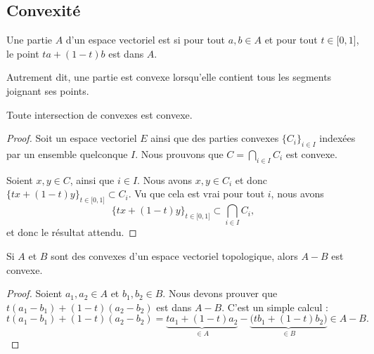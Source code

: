 \subsection{Convexité}

\begin{definition}        \label{DEFooQQEOooAFKbcQ}
	Une partie \( A\) d'un espace vectoriel est  si pour tout \( a,b\in A\) et pour tout \( t\in \mathopen[ 0 , 1 \mathclose]\), le point \( ta+(1-t)b\) est dans \( A\).

	Autrement dit, une partie est convexe lorsqu'elle contient tous les segments joignant ses points.
\end{definition}

\begin{proposition} \label{PROPooJOCEooUKhkqQ}
	Toute intersection de convexes est convexe.
\end{proposition}

\begin{proof}
	Soit un espace vectoriel \( E\) ainsi que des parties convexes \( \{  C_i \}_{i\in I}\) indexées par un ensemble quelconque \( I\). Nous prouvons que \( C= \bigcap_{i\in I}C_i\) est convexe.

	Soient \( x, y\in C\), ainsi que \( i\in I\). Nous avons \( x,y\in C_i\) et donc \( \{ tx+(1-t)y \}_{t\in \mathopen[ 0 , 1 \mathclose]}\subset C_i\). Vu que cela est vrai pour tout \( i\), nous avons
	\begin{equation}
		\{ tx+(1-t)y \}_{t\in \mathopen[ 0 , 1 \mathclose]}\subset \bigcap_{i\in I}C_i,
	\end{equation}
	et donc le résultat attendu.
\end{proof}


\begin{proposition}	\label{PROPooJOXUooEZELna}
	Si \( A\) et \( B\) sont des convexes d'un espace vectoriel topologique, alors \( A-B\) est convexe.
\end{proposition}

\begin{proof}
	Soient \( a_1,a_2\in A\) et \( b_1,b_2\in B\). Nous devons prouver que \( t(a_1-b_1)+(1-t)(a_2-b_2)\) est dans \( A-B\). C'est un simple calcul :
	\begin{equation}
		t(a_1-b_1)+(1-t)(a_2-b_2)=\underbrace{ta_1+(1-t)a_2}_{\in A}-\underbrace{\big( tb_1+(1-t)b_2 \big)}_{\in B}\in A-B.
	\end{equation}
\end{proof}

